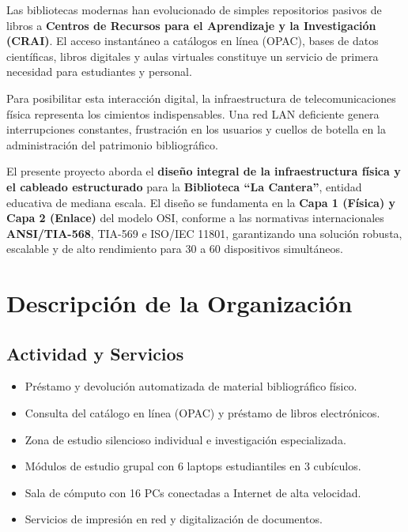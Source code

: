 \documentclass[12pt,a4paper]{article}
\begin{document}
Las bibliotecas modernas han evolucionado de simples repositorios pasivos de libros a \textbf{Centros de Recursos para el Aprendizaje y la Investigación (CRAI)}. El acceso instantáneo a catálogos en línea (OPAC), bases de datos científicas, libros digitales y aulas virtuales constituye un servicio de primera necesidad para estudiantes y personal.

Para posibilitar esta interacción digital, la infraestructura de telecomunicaciones física representa los cimientos indispensables. Una red LAN deficiente genera interrupciones constantes, frustración en los usuarios y cuellos de botella en la administración del patrimonio bibliográfico.

El presente proyecto aborda el \textbf{diseño integral de la infraestructura física y el cableado estructurado} para la \textbf{Biblioteca ``La Cantera''}, entidad educativa de mediana escala. El diseño se fundamenta en la \textbf{Capa 1 (Física) y Capa 2 (Enlace)} del modelo OSI, conforme a las normativas internacionales \textbf{ANSI/TIA-568}, TIA-569 e ISO/IEC 11801, garantizando una solución robusta, escalable y de alto rendimiento para 30 a 60 dispositivos simultáneos.

\section{Descripción de la Organización}

\subsection{Actividad y Servicios}

\begin{itemize}[leftmargin=1.5em,itemsep=2pt]
  \item Préstamo y devolución automatizada de material bibliográfico físico.
  \item Consulta del catálogo en línea (OPAC) y préstamo de libros electrónicos.
  \item Zona de estudio silencioso individual e investigación especializada.
  \item Módulos de estudio grupal con 6 laptops estudiantiles en 3 cubículos.
  \item Sala de cómputo con 16 PCs conectadas a Internet de alta velocidad.
  \item Servicios de impresión en red y digitalización de documentos.
\end{itemize}
\end{document}
